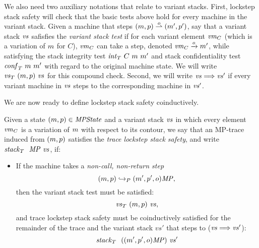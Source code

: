\documentclass[acmsmall,review,anonymous]{acmart}\settopmatter{printfolios=true,printccs=false,printacmref=false}
\begin{document}
{%


We also need two auxiliary notations that relate to variant stacks.
%
First, lockstep stack safety will check that the basic tests above hold for every
machine in the variant stack.  Given a machine that steps $(m,
p) \overset{o}{\rightharpoonup} (m', p')$, say that a variant
stack $\mathit{vs}$ safisfies the \emph{variant stack test} if for each
variant element $\mathit{vm}_{C}$ (which is a variation of $m$ for $C$),
$\mathit{vm}_{C}$ can take a step, denoted $\mathit{vm}_{C} \xrightarrow{o} m'$,
while satisfying the stack integrity test $\mathit{int}_T ~ C ~ m ~ m'$
and stack confidentiality test $\mathit{conf}_T ~ m ~ m'$ with regard
to the original machine state. We will write $\mathit{\mathit{vs}}_T ~ (m,
  p) ~ \mathit{vs}$ for this compound check.
%
Second, we will write $\mathit{vs} \Longrightarrow \mathit{vs}'$ if every variant machine
in $\mathit{vs}$ steps to the corresponding machine in $\mathit{vs}'$.
%

We are now ready to define lockstep stack safety coinductively.

 Given a state $(m, p) \in \mathit{MPState}$ and a variant stack
$\mathit{vs}$ in which every element $\mathit{vm}_{C}$ is a variation of $m$
with respect to its contour, we say that an MP-trace induced from
$(m, p)$ satisfies the \emph{trace lockstep stack safety}, and write
$\mathit{stack}_T ~  ~ \mathit{MP} ~ \mathit{vs}$, if:

\begin{itemize}

\item
  If the machine takes a \emph{non-call, non-return step}
  \[(m, p) \hookrightarrow_P (m', p', o)\mathit{MP},\]
  then the variant stack test must be satisfied:
  \[\mathit{\mathit{vs}}_T ~ (m, p) ~ \mathit{vs},\]
  and trace lockstep stack safety must be coinductively satisfied for
  the remainder of the trace and the variant stack $vs'$ that
  steps to ($\mathit{vs} \Longrightarrow \mathit{vs}'$):
  \[ \mathit{stack}_T ~  ~ ((m',p',o)\mathit{MP}) ~ \mathit{vs}'\]


\end{itemize}}
\end{document}
